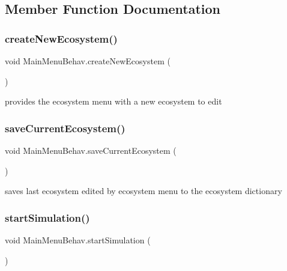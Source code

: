 \subsection{Member Function Documentation}
\mbox{\label{class_main_menu_behav_ae23e7f61fb7c6affea630307fac58f92}} 
\subsubsection{\texorpdfstring{create\+New\+Ecosystem()}{createNewEcosystem()}}
{\footnotesize\ttfamily void Main\+Menu\+Behav.\+create\+New\+Ecosystem (\begin{DoxyParamCaption}{ }\end{DoxyParamCaption})}



provides the ecosystem menu with a new ecosystem to edit 

\mbox{\label{class_main_menu_behav_ac17fe569792552206ddae7d65d66ced3}} 
\subsubsection{\texorpdfstring{save\+Current\+Ecosystem()}{saveCurrentEcosystem()}}
{\footnotesize\ttfamily void Main\+Menu\+Behav.\+save\+Current\+Ecosystem (\begin{DoxyParamCaption}{ }\end{DoxyParamCaption})}



saves last ecosystem edited by ecosystem menu to the ecosystem dictionary 

\mbox{\label{class_main_menu_behav_a9d999e202894ebe1df82a88e677cc45e}} 
\subsubsection{\texorpdfstring{start\+Simulation()}{startSimulation()}}
{\footnotesize\ttfamily void Main\+Menu\+Behav.\+start\+Simulation (\begin{DoxyParamCaption}{ }\end{DoxyParamCaption})}



